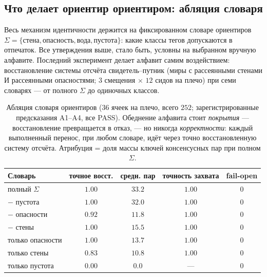 \documentclass{article}
\begin{document}
\subsection{Что делает ориентир ориентиром: абляция словаря}
\label{p3:sec:ablation}

Весь механизм идентичности держится на фиксированном словаре
ориентиров $\Sigma = \{\texttt{стена}, \texttt{опасность},
\texttt{вода}, \texttt{пустота}\}$: какие классы тегов допускаются в
отпечаток. Все утверждения выше, стало быть, условны на выбранном
вручную алфавите. Последний эксперимент делает алфавит самим
воздействием: восстановление системы отсчёта свидетель--путник (миры
с рассеянными стенами И рассеянными опасностями; $3$ смещения
$\times$ $12$ сидов на плечо) при семи словарях --- от полного
$\Sigma$ до одиночных классов.

\begin{table}[h]
\centering
\caption{Абляция словаря ориентиров ($36$ ячеек на плечо, всего $252$;
зарегистрированные предсказания A1--A4, все PASS). Обеднение алфавита
стоит \emph{покрытия} --- восстановление превращается в отказ, --- но
никогда \emph{корректности}: каждый выполненный перенос, при любом
словаре, идёт через точно восстановленную систему отсчёта. Атрибуция
= доля массы ключей консенсусных пар при полном $\Sigma$.}
\label{p3:tab:ablation}
\small
\begin{tabular}{lcccc}
\toprule
Словарь & точное восст. & средн. пар & точность захвата & fail-open \\
\midrule
полный $\Sigma$ & $1.00$ & $33.2$ & $1.00$ & $0$ \\
$-$ пустота & $1.00$ & $32.0$ & $1.00$ & $0$ \\
$-$ опасности & $0.92$ & $11.8$ & $1.00$ & $0$ \\
$-$ стены & $1.00$ & $15.5$ & $1.00$ & $0$ \\
только опасности & $1.00$ & $13.7$ & $1.00$ & $0$ \\
только стены & $0.83$ & $10.8$ & $1.00$ & $0$ \\
только пустота & $0.00$ & $0.0$ & --- & $0$ \\
\bottomrule
\end{tabular}
\end{table}
\end{document}
